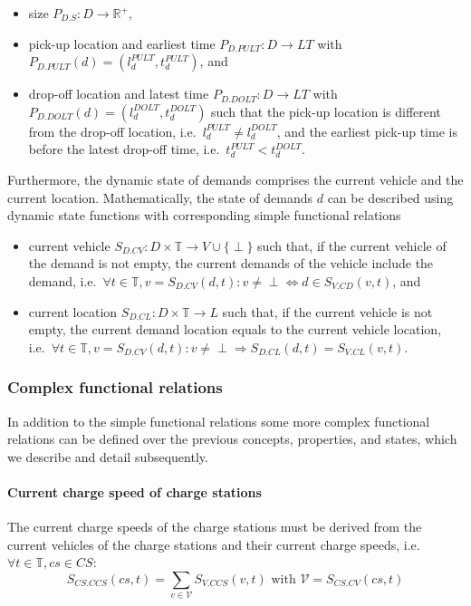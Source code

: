 \documentclass[graybox]{svmult}
\begin{document}
\begin{itemize}
	\item size $P_{D.S}: D \rightarrow \mathbb{R}^+$,
	\item pick-up location and earliest time $P_{D.PULT}: D \rightarrow LT$ with $P_{D.PULT}(d) = (l_d^{PULT},t_d^{PULT})$, and
	\item drop-off location and latest time $P_{D.DOLT}: D \rightarrow LT$ with $P_{D.DOLT}(d) = (l_d^{DOLT},t_d^{DOLT})$ such that the pick-up location is different from the drop-off location, i.e.\ $l_d^{PULT} \neq l_d^{DOLT}$, and the earliest pick-up time is before the latest drop-off time, i.e.\ $t_d^{PULT} < t_d^{DOLT}$.
\end{itemize}
Furthermore, the dynamic state of demands comprises the current vehicle and the current location.
Mathematically, the state of demands $d$ can be described using dynamic state functions with corresponding simple functional relations
\begin{itemize}
	\item current vehicle $S_{D.CV}: D \times \mathbb{T} \rightarrow V \cup \{\perp\}$ such that, if the current vehicle of the demand is not empty, the current demands of the vehicle include the demand, i.e.\ $\forall t \in \mathbb{T}, v = S_{D.CV}(d,t): v \neq \perp \Leftrightarrow d \in S_{V.CD}(v,t)$, and
	\item current location $S_{D.CL}: D \times \mathbb{T} \rightarrow L$ such that, if the current vehicle is not empty, the current demand location equals to the current vehicle location, i.e.\ $\forall t \in \mathbb{T}, v = S_{D.CV}(d,t): v \neq \perp \Rightarrow S_{D.CL}(d,t)=S_{V.CL}(v,t)$.
\end{itemize}

\subsubsection{Complex functional relations}
\label{sec:complex}
In addition to the simple functional relations some more complex functional relations can be defined over the previous concepts, properties, and states, which we describe and detail subsequently.

\paragraph{Current charge speed of charge stations}
The current charge speeds of the charge stations must be derived from the current vehicles of the charge stations and their current charge speeds, i.e.\ $\forall t \in \mathbb{T}, cs \in CS:$
\[
S_{CS.CCS}(cs,t)=\sum_{v \in \mathcal{V}}S_{V.CCS}(v,t) \textrm{ with } \mathcal{V}=S_{CS.CV}(cs,t)
\]
\end{document}
